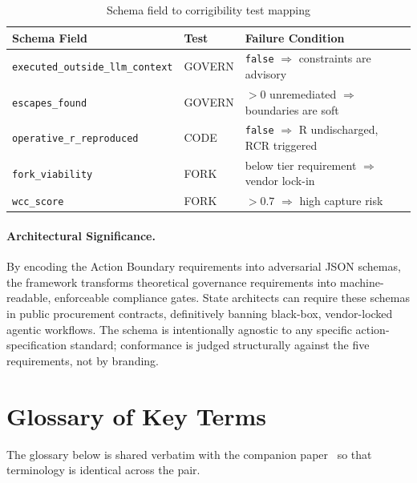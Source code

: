 \documentclass{article}
\theoremstyle{definition}
\begin{document}
\begin{table}[htbp]
\centering
\caption{Schema field to corrigibility test mapping}
\label{tab:schema-mapping}
\small
\begin{tabular}{@{}llp{5cm}@{}}
\toprule
\textbf{Schema Field} & \textbf{Test} & \textbf{Failure Condition} \\
\midrule
\texttt{executed\_outside\_llm\_context} & GOVERN & \texttt{false} $\Rightarrow$ constraints are advisory \\
\texttt{escapes\_found} & GOVERN & $> 0$ unremediated $\Rightarrow$ boundaries are soft \\
\texttt{operative\_r\_reproduced} & CODE & \texttt{false} $\Rightarrow$ R undischarged, RCR triggered \\
\texttt{fork\_viability} & FORK & below tier requirement $\Rightarrow$ vendor lock-in \\
\texttt{wcc\_score} & FORK & $> 0.7$ $\Rightarrow$ high capture risk \\
\bottomrule
\end{tabular}
\end{table}

\paragraph{Architectural Significance.} By encoding the Action Boundary requirements into adversarial JSON schemas, the framework transforms theoretical governance requirements into machine-readable, enforceable compliance gates. State architects can require these schemas in public procurement contracts, definitively banning black-box, vendor-locked agentic workflows. The schema is intentionally agnostic to any specific action-specification standard; conformance is judged structurally against the five requirements, not by branding.

\section{Glossary of Key Terms}
\label{appendix:glossary}

The glossary below is shared verbatim with the companion paper~\citep{aravind2026dpi} so that terminology is identical across the pair.






\end{document}
